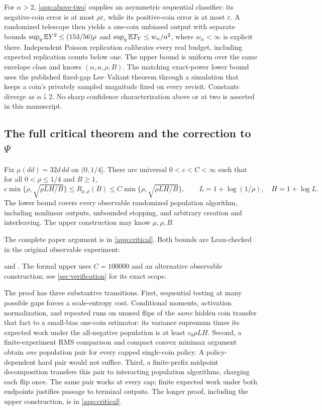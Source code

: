 For $\alpha>2$, \cref{app:above-two} supplies an asymmetric sequential
classifier: its negative-coin error is at most $\rho\varepsilon$, while
its positive-coin error is at most $\varepsilon$. A randomized telescope
then yields a one-coin unbiased output with separate bounds
$\sup_q\mathbb E Y^2\le(153/56)\rho$ and $\sup_q\mathbb E T_Y\le w_\alpha/a^2$,
where $w_\alpha<\infty$ is explicit there. Independent Poisson replication
calibrates every real budget, including expected replication counts
below one. The upper bound is uniform over the same envelope class and
knows $(\alpha,a,\rho,B)$.
The matching exact-power lower bound uses the published fixed-gap
Lee--Valiant theorem through a simulation that keeps a coin's privately
sampled magnitude fixed on every revisit. Constants diverge as
$\alpha\downarrow2$. No sharp confidence characterization above or at
two is asserted in this manuscript.

\subsection{The full critical theorem and the correction to \texorpdfstring{$\Psi$}{Psi}}
\begin{theorem}\label{thm:v5-critical}
Fix $\mu(dd)=32d\,dd$ on $(0,1/4]$. There are universal
$0<c<C<\infty$ such that for all $0<\rho\le1/4$ and $B\ge1$,
\[
 c\min\{\rho,\sqrt{\rho L H/B}\}
 \le R_{\mu,\rho}(B)
 \le C\min\{\rho,\sqrt{\rho L H/B}\},\qquad
 L=1+\log(1/\rho),\quad H=1+\log L.
\]
The lower bound covers every observable randomized population algorithm,
including nonlinear outputs, unbounded stopping, and arbitrary creation
and interleaving. The upper construction may know $\mu,\rho,B$.
\end{theorem}
\noindent The complete paper argument is in \cref{app:critical}.
Both bounds are Lean-checked in the original observable experiment:
\par\noindent
{}
and .
The formal upper uses $C=100000$ and an alternative observable construction;
see \cref{sec:verification} for its exact scope.

The proof has three substantive transitions. First, sequential testing
at many possible gaps forces a scale-entropy cost. Conditional moments,
activation normalization, and repeated runs on unused flips of the
\emph{same} hidden coin transfer that fact to a small-bias one-coin
estimator: its variance supremum times its expected work under the
all-negative population is at least $c_0\rho LH$.
Second, a finite-experiment RMS comparison and compact convex minimax
argument obtain \emph{one} population pair for every capped single-coin
policy. A policy-dependent hard pair would not suffice.
Third, a finite-prefix midpoint decomposition transfers this pair to
interacting population algorithms, charging each flip once. The same
pair works at every cap; finite expected work under both endpoints
justifies passage to terminal outputs. The longer proof, including the
upper construction, is in \cref{app:critical}.

